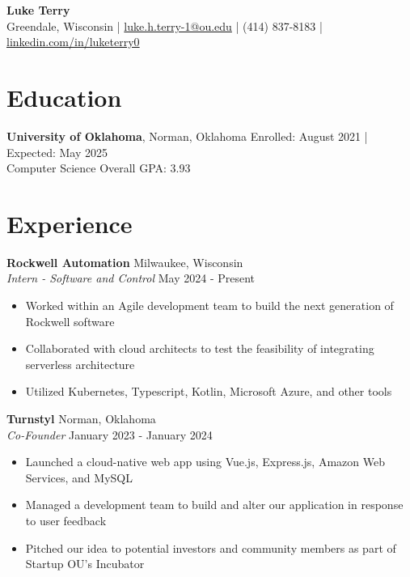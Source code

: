 \documentclass[a4paper,10pt]{extarticle}
\begin{document}
\pagestyle{empty}

\begin{center}
\textbf{\Large Luke Terry}\\[2pt] %
Greendale, Wisconsin | \href{mailto:luke.h.terry-1@ou.edu}{luke.h.terry-1@ou.edu} | (414) 837-8183 | \href{https://www.linkedin.com/in/luketerry0/}{linkedin.com/in/luketerry0}
\end{center}

\section*{Education}
\noindent
\textbf{University of Oklahoma}, Norman, Oklahoma \hfill Enrolled: August 2021 | Expected: May 2025\\ %
Computer Science \hfill Overall GPA: 3.93\\ %

\section*{Experience}

\noindent
\textbf{Rockwell Automation} \hfill Milwaukee, Wisconsin\\ %
\textit{Intern - Software and Control} \hfill May 2024 - Present %
\begin{itemize}
    \item Worked within an Agile development team to build the next generation of Rockwell software
    \item Collaborated with cloud architects to test the feasibility of integrating serverless architecture
    \item Utilized Kubernetes, Typescript, Kotlin, Microsoft Azure, and other tools
\end{itemize}

\noindent
\textbf{Turnstyl} \hfill Norman, Oklahoma\\ %
\textit{Co-Founder} \hfill January 2023 - January 2024 %
\begin{itemize}
    \item Launched a cloud-native web app using Vue.js, Express.js, Amazon Web Services, and MySQL
    \item Managed a development team to build and alter our application in response to user feedback
    \item Pitched our idea to potential investors and community members as part of Startup OU's Incubator
\end{itemize}
\end{document}
